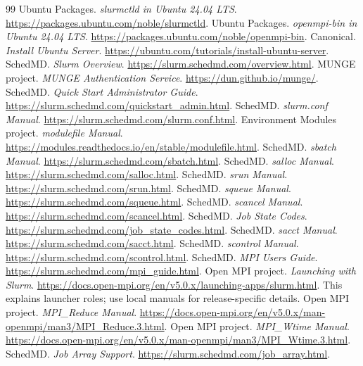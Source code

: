 \documentclass[11pt,a4paper]{article}
\begin{document}
\clearpage
\begin{thebibliography}{99}
\small
{} Ubuntu Packages. \emph{slurmctld in Ubuntu 24.04 LTS}.
\url{https://packages.ubuntu.com/noble/slurmctld}.
 Ubuntu Packages. \emph{openmpi-bin in Ubuntu 24.04 LTS}.
\url{https://packages.ubuntu.com/noble/openmpi-bin}.
 Canonical. \emph{Install Ubuntu Server}.
\url{https://ubuntu.com/tutorials/install-ubuntu-server}.
 SchedMD. \emph{Slurm Overview}.
\url{https://slurm.schedmd.com/overview.html}.
 MUNGE project. \emph{MUNGE Authentication Service}.
\url{https://dun.github.io/munge/}.
 SchedMD. \emph{Quick Start Administrator Guide}.
\url{https://slurm.schedmd.com/quickstart_admin.html}.
 SchedMD. \emph{slurm.conf Manual}.
\url{https://slurm.schedmd.com/slurm.conf.html}.
 Environment Modules project. \emph{modulefile Manual}.
\url{https://modules.readthedocs.io/en/stable/modulefile.html}.
 SchedMD. \emph{sbatch Manual}.
\url{https://slurm.schedmd.com/sbatch.html}.
 SchedMD. \emph{salloc Manual}.
\url{https://slurm.schedmd.com/salloc.html}.
 SchedMD. \emph{srun Manual}.
\url{https://slurm.schedmd.com/srun.html}.
 SchedMD. \emph{squeue Manual}.
\url{https://slurm.schedmd.com/squeue.html}.
 SchedMD. \emph{scancel Manual}.
\url{https://slurm.schedmd.com/scancel.html}.
 SchedMD. \emph{Job State Codes}.
\url{https://slurm.schedmd.com/job_state_codes.html}.
 SchedMD. \emph{sacct Manual}.
\url{https://slurm.schedmd.com/sacct.html}.
 SchedMD. \emph{scontrol Manual}.
\url{https://slurm.schedmd.com/scontrol.html}.
 SchedMD. \emph{MPI Users Guide}.
\url{https://slurm.schedmd.com/mpi_guide.html}.
 Open MPI project. \emph{Launching with Slurm}.
\url{https://docs.open-mpi.org/en/v5.0.x/launching-apps/slurm.html}.
This explains launcher roles; use local manuals for release-specific details.
 Open MPI project. \emph{MPI\_Reduce Manual}.
\url{https://docs.open-mpi.org/en/v5.0.x/man-openmpi/man3/MPI_Reduce.3.html}.
 Open MPI project. \emph{MPI\_Wtime Manual}.
\url{https://docs.open-mpi.org/en/v5.0.x/man-openmpi/man3/MPI_Wtime.3.html}.
 SchedMD. \emph{Job Array Support}.
\url{https://slurm.schedmd.com/job_array.html}.
\end{thebibliography}
\end{document}
